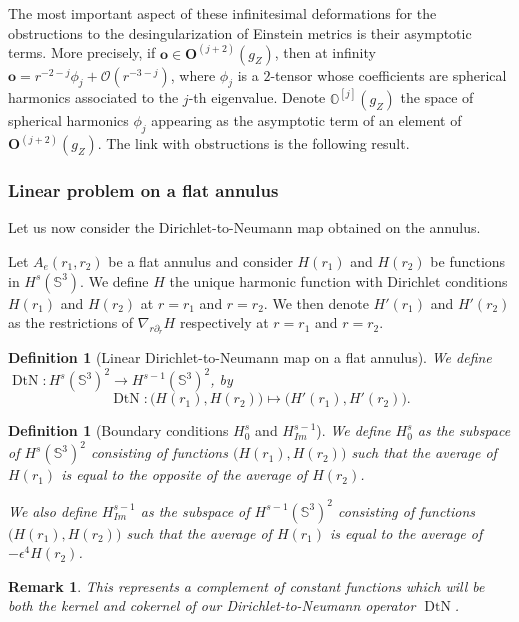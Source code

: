 \documentclass[12pt]{article}
\newtheorem{defn}[thm]{Definition}
\newtheorem{rem}[thm]{Remark}
\begin{document}
   The most important aspect of these infinitesimal deformations for the obstructions to the desingularization of Einstein metrics is their asymptotic terms. More precisely, if $\mathbf{o}\in \mathbf{O}^{(j+2)}({g_Z})$, then at infinity $\mathbf{o} = r^{-2-j} \phi_{j} + \mathcal{O}(r^{-3-j})$, where $\phi_{j}$ is a $2$-tensor whose coefficients are spherical harmonics associated to the $j$-th eigenvalue. Denote 
   $ \mathbb{O}^{[j]}({g_Z}) $ the space of spherical harmonics $\phi_{j}$ appearing as the asymptotic term of an element of $\mathbf{O}^{(j+2)}({g_Z})$. The link with obstructions is the following result.


\subsubsection{Linear problem on a flat annulus}


    Let us now consider the Dirichlet-to-Neumann map obtained on the annulus.
    
    Let $A_e(r_1,r_2)$ be a flat annulus and consider $H(r_1)$ and $H(r_2)$ be functions in $H^s(\mathbb{S}^3)$. We define $ H $ the unique harmonic function with Dirichlet conditions $H(r_1)$ and $H(r_2)$ at $r=r_1$ and $r=r_2$. We then denote $H'(r_1)$ and $H'(r_2)$ as the restrictions of $\nabla_{r\partial_r}H$ respectively at $r=r_1$ and
    $r=r_2$.
    
    \begin{defn}[Linear Dirichlet-to-Neumann map on a flat annulus]
        We define $\operatorname{DtN}: H^s(\mathbb{S}^3)^2 \to H^{s-1}(\mathbb{S}^3)^2$, by $$\operatorname{DtN}:\big(H(r_1),H(r_2)\big)\mapsto \big(H'(r_1),H'(r_2)\big).$$
    \end{defn}
    
    \begin{defn}[Boundary conditions $ H^s_{0} $ and $H^{s-1}_{Im}$]
        We define $ H^s_{0} $ as the subspace of $H^s(\mathbb{S}^3)^2$ consisting of functions $\big(H(r_1),H(r_2)\big)$ such that the average of $H(r_1)$ is equal to the opposite of the average of $H(r_2)$. 
        
        We also define $H^{s-1}_{Im}$ as the subspace of $H^{s-1}(\mathbb{S}^3)^2$ consisting of functions $\big(H(r_1),H(r_2)\big)$ such that the average of $H(r_1)$ is equal to the average of $-\epsilon^4H(r_2)$. 
    \end{defn}
    \begin{rem}
        This represents a complement of constant functions which will be both the kernel and cokernel of our Dirichlet-to-Neumann operator $\operatorname{DtN}$.
    \end{rem}
    
\end{document}
